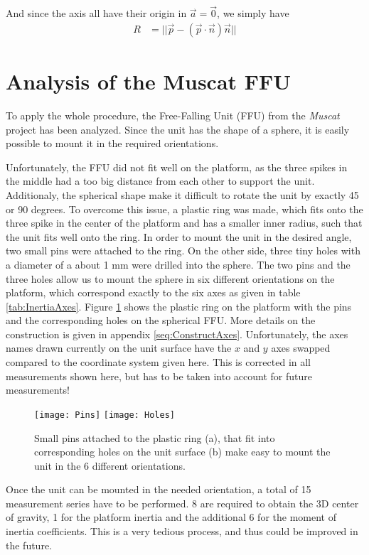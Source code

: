 \documentclass[journal]{IEEEtran}
\begin{document}
And since the axis all have their origin in $\vec{a} = \vec{0}$, we simply have
\begin{align}
	R & = || \vec{p} - (\vec{p} \cdot \vec{n}) \vec{n} ||
\end{align}

\section{Analysis of the Muscat FFU}

To apply the whole procedure, the Free-Falling Unit (FFU) from the \emph{Muscat} project has been analyzed.
Since the unit has the shape of a sphere, it is easily possible to mount it in the required orientations. 

Unfortunately, the FFU did not fit well on the platform, as the three spikes in the middle had a too big distance from each other to support the unit.
Additionaly, the spherical shape make it difficult to rotate the unit by exactly 45 or 90 degrees.
To overcome this issue, a plastic ring was made, which fits onto the three spike in the center of the platform and has a smaller inner radius, such that the unit fits well onto the ring.
In order to mount the unit in the desired angle, two small pins were attached to the ring. On the other side, three tiny holes with a diameter of a about 1 mm were drilled into the sphere. The two pins and the three holes allow us to mount the sphere in six different orientations on the platform, which correspond exactly to the six axes as given in table \ref{tab:InertiaAxes}.
Figure \ref{fig:PinsHoles} shows the plastic ring on the platform with the pins and the corresponding holes on the spherical FFU.
More details on the construction is given in appendix \ref{seq:ConstructAxes}.
Unfortunately, the axes names drawn currently on the unit surface have the $x$ and $y$ axes swapped compared to the coordinate system given here. This is corrected in all measurements shown here, but has to be taken into account for future measurements!

\begin{figure}
	\centering
	\texttt{[image: Pins]}
	\texttt{[image: Holes]}
	\caption{Small pins attached to the plastic ring (a), that fit into corresponding holes on the unit surface (b) make easy to mount the unit in the 6 different orientations.}
	\label{fig:PinsHoles}
\end{figure}

Once the unit can be mounted in the needed orientation, a total of 15 measurement series have to be performed. 8 are required to obtain the 3D center of gravity, 1 for the platform inertia and the additional 6 for the moment of inertia coefficients.
This is a very tedious process, and thus could be improved in the future.
\end{document}
